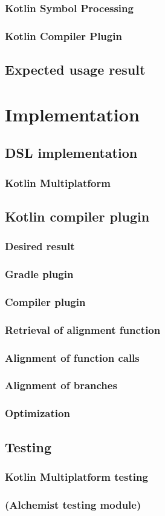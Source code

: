 \subsubsection{Kotlin Symbol Processing}
\subsubsection{Kotlin Compiler Plugin}
\subsection{Expected usage result}

\section{Implementation}
\subsection{DSL implementation}
\subsubsection{Kotlin Multiplatform}
\subsection{Kotlin compiler plugin}
\subsubsection{Desired result}
\subsubsection{Gradle plugin}
\subsubsection{Compiler plugin}
\subsubsection{Retrieval of alignment function}
\subsubsection{Alignment of function calls}
\subsubsection{Alignment of branches}
\subsubsection{Optimization}
\subsection{Testing}
\subsubsection{Kotlin Multiplatform testing}
\subsubsection{(Alchemist testing module)}
